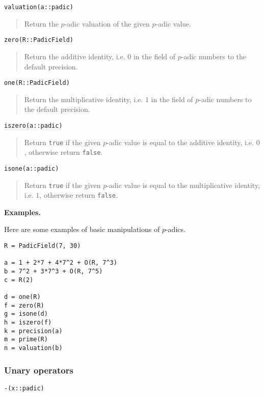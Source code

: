 \documentclass[a4paper,10pt]{article}
\newcommand{\code}{\lstinline}
\newcommand{\desc}[1]{\vspace{-3mm}\begin{quote}#1\end{quote}}
\begin{document}
{{\begin{lstlisting}
valuation(a::padic)
\end{lstlisting}

\desc{Return the $p$-adic valuation of the given $p$-adic value.}

\begin{lstlisting}
zero(R::PadicField)
\end{lstlisting}

\desc{Return the additive identity, i.e. $0$ in the field of $p$-adic
numbers to the default precision.}

\begin{lstlisting}
one(R::PadicField)
\end{lstlisting}

\desc{Return the multiplicative identity, i.e. $1$ in the field of
$p$-adic numbers to the default precision.}

\begin{lstlisting}
iszero(a::padic)
\end{lstlisting}

\desc{Return \code{true} if the given $p$-adic value is equal to the additive identity,
i.e. $0$, otherwise return \code{false}.}

\begin{lstlisting}
isone(a::padic)
\end{lstlisting}

\desc{Return \code{true} if the given $p$-adic value is equal to the multiplicative
identity, i.e. $1$, otherwise return \code{false}.}

\textbf{Examples.}

Here are some examples of basic manipulations of $p$-adics.

\begin{lstlisting}
R = PadicField(7, 30)

a = 1 + 2*7 + 4*7^2 + O(R, 7^3)
b = 7^2 + 3*7^3 + O(R, 7^5)
c = R(2)

d = one(R)
f = zero(R)
g = isone(d)
h = iszero(f)
k = precision(a)
m = prime(R)
n = valuation(b)
\end{lstlisting}

\subsubsection{Unary operators}

\begin{lstlisting}
-(x::padic)
\end{lstlisting}

}}
\end{document}
